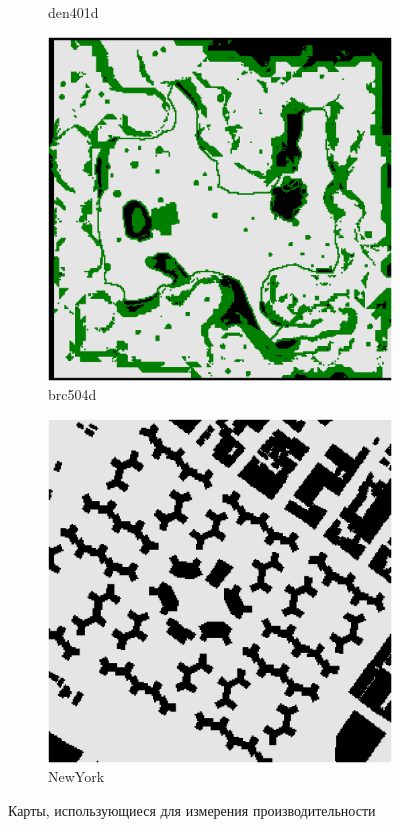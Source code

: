 \documentclass[11pt]{article}
\begin{document}
\begin{figure}
\begin{subfigure}[b]{0.24\textwidth}
            \caption{den401d}
        \end{subfigure}
        \hfill
        \begin{subfigure}[b]{0.24\textwidth}
            \centering
            \includegraphics[width=\textwidth]{../maps/brc504d}
            \caption{brc504d}
        \end{subfigure}
        \begin{subfigure}[b]{0.24\textwidth}
            \centering
            \includegraphics[width=\textwidth]{../maps/NewYork_1_256}
            \caption{NewYork}
        \end{subfigure}
        \caption{Карты, использующиеся для измерения производительности}
        \label{fig:maps}
    \end{figure}
\end{document}
